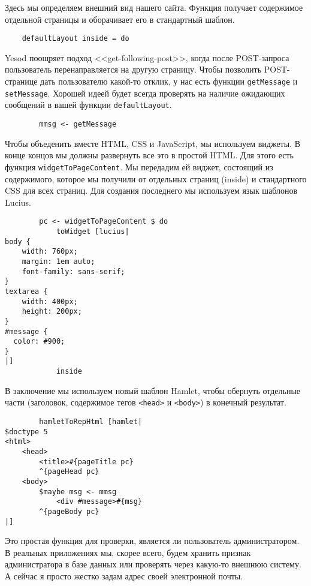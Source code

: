 Здесь мы определяем внешний вид нашего сайта. Функция получает содержимое отдельной страницы и оборачивает его в стандартный шаблон. 
 
\begin{lstlisting}
    defaultLayout inside = do
\end{lstlisting}
 
Yesod поощряет подход <<get-following-post>>, когда после POST-запроса пользователь перенаправляется на другую страницу. Чтобы позволить POST-странице дать пользователю какой-то отклик, у нас есть функции \lstinline!getMessage! и \lstinline!setMessage!. Хорошей идеей будет всегда проверять на наличие ожидающих сообщений в вашей функции \lstinline!defaultLayout!. 
 
\begin{lstlisting}
        mmsg <- getMessage
\end{lstlisting}

Чтобы объеденить вместе HTML, CSS и JavaScript, мы используем виджеты. В конце концов мы должны развернуть все это в простой HTML. Для этого есть функция \lstinline!widgetToPageContent!. Мы передадим ей виджет, состоящий из содержимого, которое мы получили от отдельных страниц (inside) и стандартного CSS для всех страниц. Для создания последнего мы используем язык шаблонов Lucius. 
 
\begin{lstlisting}
        pc <- widgetToPageContent $ do
            toWidget [lucius|
body {
    width: 760px;
    margin: 1em auto;
    font-family: sans-serif;
}
textarea {
    width: 400px;
    height: 200px;
}
#message {
  color: #900;
}
|]
            inside
\end{lstlisting}%
 
В заключение мы используем новый шаблон Hamlet, чтобы обернуть отдельные части (заголовок, содержимое тегов \lstinline!<head>! и \lstinline!<body>!) в конечный результат. 
 
\begin{lstlisting}
        hamletToRepHtml [hamlet|
$doctype 5
<html>
    <head>
        <title>#{pageTitle pc}
        ^{pageHead pc}
    <body>
        $maybe msg <- mmsg
            <div #message>#{msg}
        ^{pageBody pc}
|]
\end{lstlisting}
 
Это простая функция для проверки, является ли пользователь администратором. В реальных приложениях мы, скорее всего, будем хранить признак администратора в базе данных или проверять через какую-то внешнюю систему. А сейчас я просто жестко задам адрес своей электронной почты. 
 
